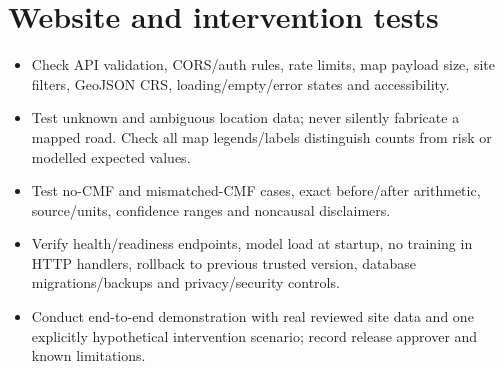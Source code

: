 \documentclass[11pt,a4paper,openany]{report}
\begin{document}
\section{Website and intervention tests}
\begin{itemize}
\item Check API validation, CORS/auth rules, rate limits, map payload size, site filters, GeoJSON CRS, loading/empty/error states and accessibility.
\item Test unknown and ambiguous location data; never silently fabricate a mapped road. Check all map legends/labels distinguish counts from risk or modelled expected values.
\item Test no-CMF and mismatched-CMF cases, exact before/after arithmetic, source/units, confidence ranges and noncausal disclaimers.
\item Verify health/readiness endpoints, model load at startup, no training in HTTP handlers, rollback to previous trusted version, database migrations/backups and privacy/security controls.
\item Conduct end-to-end demonstration with real reviewed site data and one explicitly hypothetical intervention scenario; record release approver and known limitations.
\end{itemize}
\end{document}
